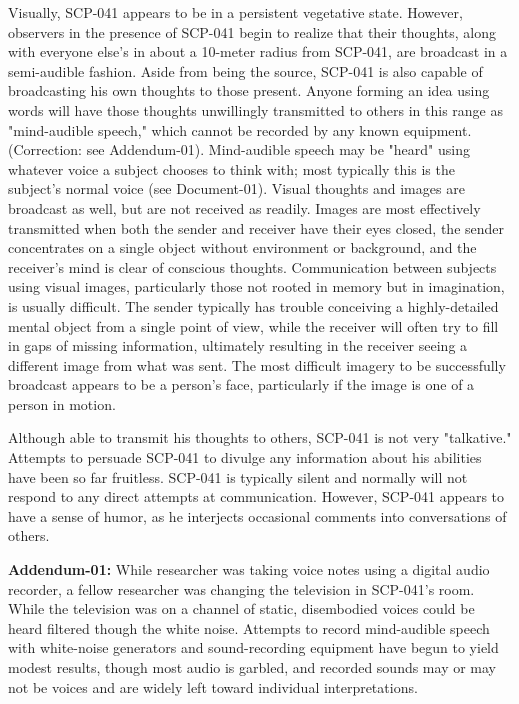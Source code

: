 Visually, SCP-041 appears to be in a persistent vegetative state. However, observers in the presence of SCP-041 begin to realize that their thoughts, along with everyone else's in about a 10-meter radius from SCP-041, are broadcast in a semi-audible fashion. Aside from being the source, SCP-041 is also capable of broadcasting his own thoughts to those present. Anyone forming an idea using words will have those thoughts unwillingly transmitted to others in this range as "mind-audible speech," which cannot be recorded by any known equipment. (Correction: see Addendum-01). Mind-audible speech may be "heard" using whatever voice a subject chooses to think with; most typically this is the subject's normal voice (see Document-01).
\newpage
Visual thoughts and images are broadcast as well, but are not received as readily. Images are most effectively transmitted when both the sender and receiver have their eyes closed, the sender concentrates on a single object without environment or background, and the receiver’s mind is clear of conscious thoughts. Communication between subjects using visual images, particularly those not rooted in memory but in imagination, is usually difficult. The sender typically has trouble conceiving a highly-detailed mental object from a single point of view, while the receiver will often try to fill in gaps of missing information, ultimately resulting in the receiver seeing a different image from what was sent. The most difficult imagery to be successfully broadcast appears to be a person's face, particularly if the image is one of a person in motion.

Although able to transmit his thoughts to others, SCP-041 is not very "talkative." Attempts to persuade SCP-041 to divulge any information about his abilities have been so far fruitless. SCP-041 is typically silent and normally will not respond to any direct attempts at communication. However, SCP-041 appears to have a sense of humor, as he interjects occasional comments into conversations of others.

\textbf{Addendum-01:} While researcher   was taking voice notes using a digital audio recorder, a fellow researcher was changing the television in SCP-041's room. While the television was on a channel of static, disembodied voices could be heard filtered though the white noise. Attempts to record mind-audible speech with white-noise generators and sound-recording equipment have begun to yield modest results, though most audio is garbled, and recorded sounds may or may not be voices and are widely left toward individual interpretations.

